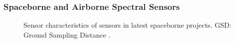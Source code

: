 \documentclass[10pt,mathserif]{beamer}
\begin{document}
    \begin{frame}
        \frametitle{Spaceborne and Airborne Spectral Sensors}
        \begin{figure}
            \caption{Sensor characteristics of sensors in latest spaceborne projects.\newline
                     GSD: Ground Sampling Distance
                     \cite{HSMS_DATA_FUSION_A_COMPARATIVE_REVIEW}.}
        \end{figure}
    \end{frame}
\end{document}
